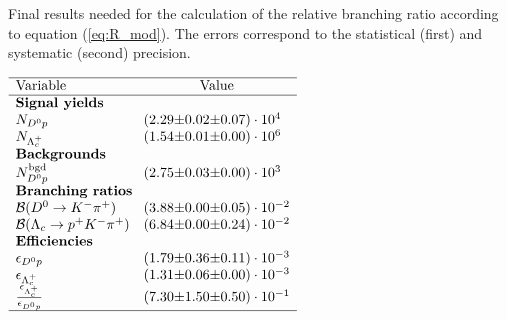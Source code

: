  
\begin{table}[h]
    \centering
    \caption{Final results needed for the calculation of the relative branching ratio \R according to equation (\ref{eq:R_mod}). The errors correspond to the statistical (first) and systematic (second) precision.}
    \label{tab:table_finalresults}
    $\begin{array}{lr@{\pm}r@{\pm}l}
    \hline
    \text{Variable} & \multicolumn{3}{c}{\text{Value}} \\
    \hline
\multicolumn{4}{l}{\text{\textbf{Signal yields}}} \\
\NDp&(2.29 & 0.02 & 0.07) \cdot 10^{4}\\
\NLc&(1.54 & 0.01 & 0.00) \cdot 10^{6}\\
\multicolumn{4}{l}{\text{\textbf{Backgrounds}}} \\
\NBgdDp&(2.75 & 0.03 & 0.00) \cdot 10^{3}\\
\multicolumn{4}{l}{\text{\textbf{Branching ratios}}} \\
\DBFDp&(3.88 & 0.00 & 0.05) \cdot 10^{-2}\\
\DBFLc&(6.84 & 0.00 & 0.24) \cdot 10^{-2}\\
\multicolumn{4}{l}{\text{\textbf{Efficiencies}}} \\
\effDp&(1.79 & 0.36 & 0.11) \cdot 10^{-3}\\
\effLc&(1.31 & 0.06 & 0.00) \cdot 10^{-3}\\
\frac{\effLc}{\effDp}&(7.30 & 1.50 & 0.50) \cdot 10^{-1}\\

    \hline
    \end{array}$
\end{table}

